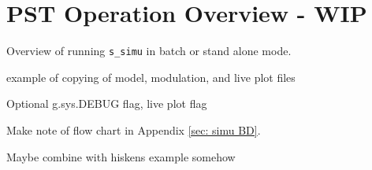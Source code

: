 \chapter{PST Operation Overview - WIP}

Overview of running \verb|s_simu| in batch or stand alone mode.

example of copying of model, modulation, and live plot files

Optional g.sys.DEBUG flag, live plot flag

Make note of flow chart in Appendix \ref{sec: simu BD}.

Maybe combine with hiskens example somehow